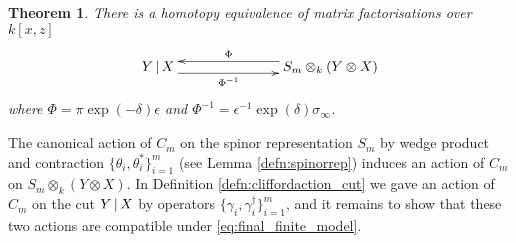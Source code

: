 \documentclass[english,letter paper,12pt,leqno]{article}
\newtheorem{theorem}{Theorem}[section]
\theoremstyle{example}
\numberwithin{equation}{section}
\def\ferm{\gamma}
\def\fermc{\gamma^\dagger}
\begin{document}
\begin{theorem}\label{theorem:htpy_equivalence_main} There is a homotopy equivalence of matrix factorisations over $k[x,z]$
\begin{equation}\label{eq:final_finite_model}
\xymatrix@C+4pc{
Y \l X \ar@<-1ex>[r]_-{\Phi^{-1}} & S_m \otimes_k ( Y \otimes X )\ar@<-1ex>[l]_-{\Phi}
}
\end{equation}
where $\Phi = \pi \exp(-\delta) \epsilon$ and $\Phi^{-1} = \epsilon^{-1} \exp(\delta) \sigma_\infty$.
\end{theorem}

The canonical action of $C_m$ on the spinor representation $S_m$ by wedge product and contraction $\{ \theta_i, \theta_i^* \}_{i=1}^m$ (see Lemma \ref{defn:spinorrep}) induces an action  of $C_m$ on $S_m \otimes_k ( Y \otimes X )$. In Definition \ref{defn:cliffordaction_cut} we gave an action of $C_m$ on the cut $Y \,|\, X$ by operators $\{ \ferm_i, \fermc_i \}_{i=1}^m$, and it remains to show that these two actions are compatible under \eqref{eq:final_finite_model}.
\end{document}

